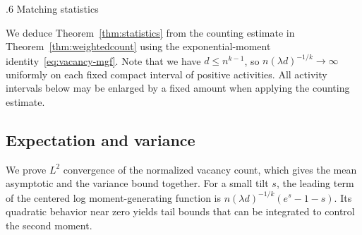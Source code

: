 \documentclass[11pt,reqno]{amsart}
\makeatletter
\numberwithin{equation}{section}
\renewcommand{\section}{\@startsection{section}{1}%
    \z@{1.3\linespacing\@plus.5\linespacing\@minus.2\linespacing}%
    {.6\linespacing}%
    {\normalfont\scshape\centering}}
\theoremstyle{plain}
\theoremstyle{definition}
\makeatother
\begin{document}

\section{Matching statistics}\label{sec:proofs}

We deduce Theorem~\ref{thm:statistics} from the counting estimate in Theorem~\ref{thm:weightedcount} using the exponential-moment identity~\eqref{eq:vacancy-mgf}.
Note that we have $d\le n^{k-1}$, so $n(\lambda d)^{-1/k}\to\infty$ uniformly on each fixed compact interval of positive activities.
All activity intervals below may be enlarged by a fixed amount when applying the counting estimate.


\subsection{Expectation and variance}\label{subsec:expectation}\label{sec:mean}\label{subsec:variance}\label{sec:variance}

We prove $L^2$ convergence of the normalized vacancy count, which gives the mean asymptotic and the variance bound together.
For a small tilt $s$, the leading term of the centered log moment-generating function is $n(\lambda d)^{-1/k}(e^s-1-s)$.
Its quadratic behavior near zero yields tail bounds that can be integrated to control the second moment.
\end{document}
